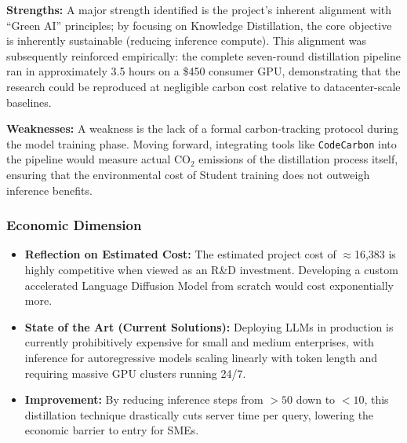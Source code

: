 \documentclass[11pt, a4paper]{article}
\begin{document}
\textbf{Strengths:} A major strength identified is the project's inherent alignment with ``Green AI'' principles; by focusing on Knowledge Distillation, the core objective is inherently sustainable (reducing inference compute). This alignment was subsequently reinforced empirically: the complete seven-round distillation pipeline ran in approximately 3.5 hours on a \$450 consumer GPU, demonstrating that the research could be reproduced at negligible carbon cost relative to datacenter-scale baselines.

\textbf{Weaknesses:} A weakness is the lack of a formal carbon-tracking protocol during the model training phase. Moving forward, integrating tools like \texttt{CodeCarbon} into the pipeline would measure actual CO$_2$ emissions of the distillation process itself, ensuring that the environmental cost of Student training does not outweigh inference benefits.

\subsubsection*{Economic Dimension}
\begin{itemize}
    \item \textbf{Reflection on Estimated Cost:} The estimated project cost of $\approx$16,383 \texteuro{} is highly competitive when viewed as an R\&D investment. Developing a custom accelerated Language Diffusion Model from scratch would cost exponentially more.
    \item \textbf{State of the Art (Current Solutions):} Deploying LLMs in production is currently prohibitively expensive for small and medium enterprises, with inference for autoregressive models scaling linearly with token length and requiring massive GPU clusters running 24/7.
    \item \textbf{Improvement:} By reducing inference steps from $>50$ down to $<10$, this distillation technique drastically cuts server time per query, lowering the economic barrier to entry for SMEs.
\end{itemize}
\end{document}
